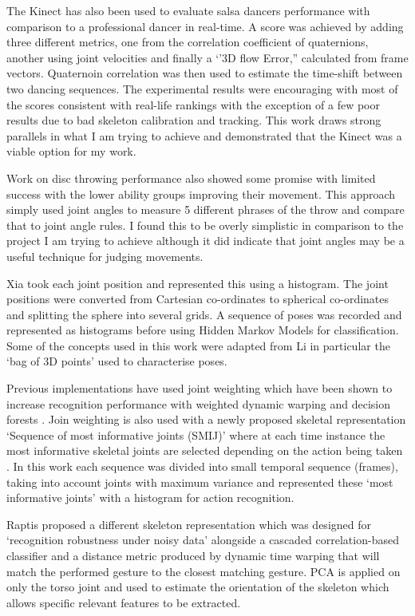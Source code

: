 The Kinect has also been used to evaluate salsa dancers performance with comparison to a professional dancer in real-time\cite{Alexiadis2011}\cite{vdpe}. A score was achieved by adding three different metrics, one from the correlation coefficient of quaternions, another using joint velocities and finally a `'3D flow Error,'' calculated from frame vectors. Quaternoin correlation was then used to estimate the time-shift between two dancing sequences.\newline
The experimental results were encouraging with most of the scores consistent with real-life rankings with the exception of a few poor results due to bad skeleton calibration and tracking. This work draws strong parallels in what I am trying to achieve and demonstrated that the Kinect was a viable option for my work.

Work on disc throwing performance\cite{Yamaoka2013} also showed some promise with limited success with the lower ability groups improving their movement. This approach simply used joint angles to measure 5 different phrases of the throw and compare that to joint angle rules. I found this to be overly simplistic in comparison to the project I am trying to achieve although it did indicate that joint angles may be a useful technique for judging movements.

Xia took each joint position and represented this using a histogram. \cite{hmm1} The joint positions were converted from Cartesian co-ordinates to spherical co-ordinates and splitting the sphere into several grids. A sequence of poses was recorded and represented as histograms before using Hidden Markov Models for classification.  Some of the concepts used in this work were adapted from Li \cite{3dbag} in particular the `bag of 3D points' used to characterise poses.

Previous implementations have used joint weighting which have been shown to increase recognition performance with weighted dynamic warping\cite{dtw1} and decision forests \cite{randforest}. Join weighting is also used with a newly proposed skeletal representation `Sequence of most informative joints (SMIJ)' where at each time instance the most informative skeletal joints are selected depending on the action being taken \cite{SMIJ}. In this work each sequence was divided into small temporal sequence (frames), taking into account joints with maximum variance and represented these `most informative joints' with a histogram for action recognition.

Raptis proposed a different skeleton representation which was designed for `recognition robustness under noisy data'\cite{Raptis2011a} alongside a cascaded correlation-based classifier and a distance metric produced by dynamic time warping  that will match the performed gesture to the closest matching gesture.\cite{Kaewplee}
PCA is applied on only the torso joint and used to estimate the orientation of the skeleton which allows specific relevant features to be extracted.


